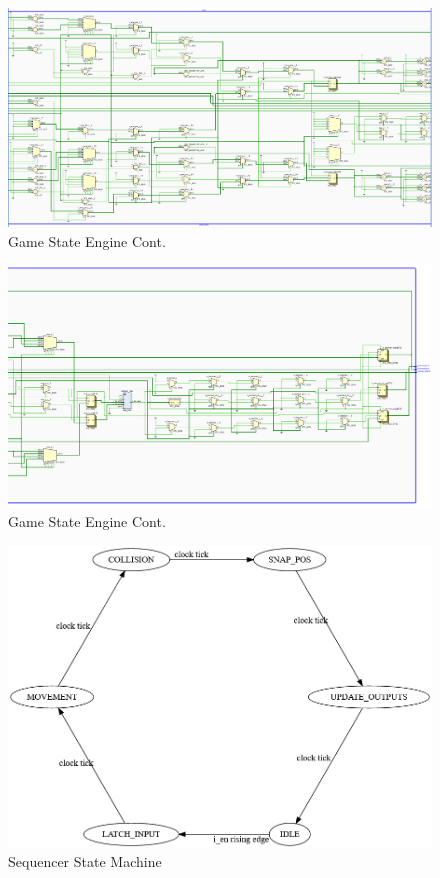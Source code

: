 \documentclass[12pt]{article}
\begin{document}
\begin{figure}
    \includegraphics[width=\textwidth]{GameStatePt2.png}
    \caption{Game State Engine Cont.}
    \label{fig:LandscapeFigure}
\end{figure}

\begin{figure}
    \includegraphics[width=\textwidth]{GameStatePt3.png}
    \caption{Game State Engine Cont.}
    \label{fig:LandscapeFigure}
\end{figure}

\begin{figure}
    \includegraphics[width=\textwidth]{Sequencer.png}
    \caption{Sequencer State Machine}
    \label{fig:LandscapeFigure}
\end{figure}
\end{document}
